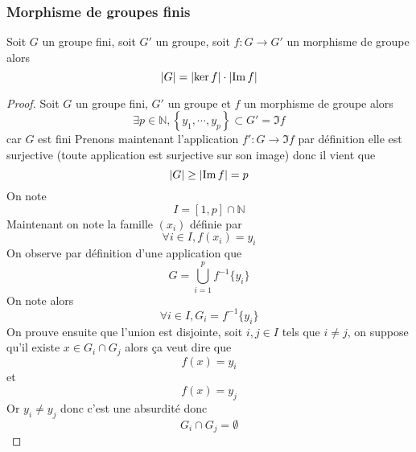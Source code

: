 \documentclass[11pt,colorlinks]{book}
\theoremstyle{mytheoremstyle}
\theoremstyle{mytheoremstyle}
\theoremstyle{mytheoremstyle}
\theoremstyle{mytheoremstyle}
\theoremstyle{mytheoremstyle}
\theoremstyle{mytheoremstyle}
\theoremstyle{mytheoremstyle}
\theoremstyle{mytheoremstyle}
\theoremstyle{myproblemstyle}
\def\mbb#1{\mathbb{#1}}
\def\bN{\mbb{N}}
\begin{document}
\subsubsection{Morphisme de groupes finis}
\begin{theorem}
  Soit $G$ un groupe fini, soit $G'$ un groupe, soit $f : G \to G'$ un morphisme de groupe alors 
  \begin{equation*}
    \abs{G} = \abs{\ker f} \cdot \abs{\Im f}
  \end{equation*}
  \begin{proof}
    Soit $G$ un groupe fini, $G'$ un groupe et $f$ un morphisme de groupe alors 
    \begin{equation*}
      \exists p \in \bN, \left\{y_1,\cdots,y_p\right\} \subset G' = \Im f
    \end{equation*}
    car $G$ est fini
    Prenons maintenant l'application $f' : G \to \Im f$ par définition elle est surjective (toute application est surjective sur son image)
    donc il vient que 
    \begin{equation*}
      \abs{G} \geq \abs{\Im f} = p
    \end{equation*}
    On note 
    \begin{equation*}
      I = [1,p] \cap \bN
    \end{equation*}
    Maintenant on note la famille $(x_i)$ définie par 
    \begin{equation*}
      \forall i \in I, f(x_i) = y_i
    \end{equation*}
    On observe par définition d'une application que 
    \begin{equation*}
      G = \bigcup_{i=1}^p f^{-1}\{y_i\}
    \end{equation*}
    On note alors 
    \begin{equation*}
      \forall i \in I, G_i = f^{-1}\{y_i\}
    \end{equation*}
    On prouve ensuite que l'union est disjointe, soit $i,j \in I$ tels que $i\not=j$, on suppose qu'il existe $x \in G_i \cap G_j$ 
    alors ça veut dire que 
    \begin{equation*}
      f(x) = y_i
    \end{equation*}
    et 
    \begin{equation*}
      f(x) = y_j
    \end{equation*}
    Or $y_i \not= y_j$ donc c'est une absurdité donc 
    \begin{equation*}
      G_i \cap G_j = \emptyset
    \end{equation*}

\end{proof}
\end{theorem}
\end{document}
